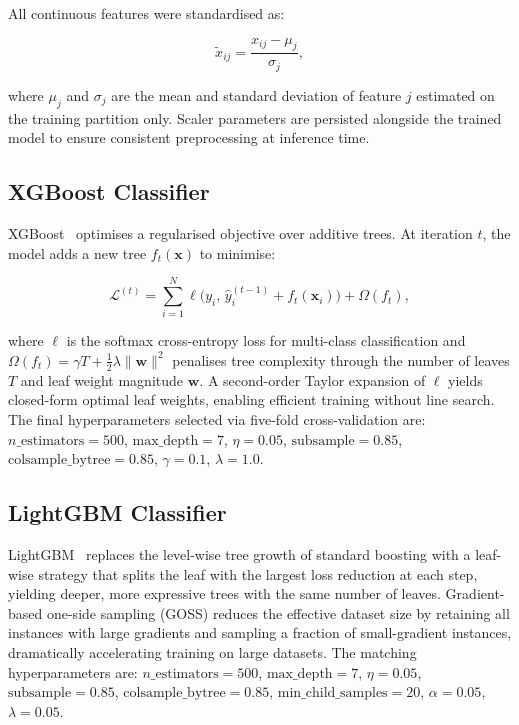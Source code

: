 \documentclass[journal]{IEEEtran}
\begin{document}
All continuous features were standardised as:

\begin{equation}
  \tilde{x}_{ij} = \frac{x_{ij} - \mu_j}{\sigma_j},
  \label{eq:zscore}
\end{equation}

\noindent where $\mu_j$ and $\sigma_j$ are the mean and standard deviation
of feature $j$ estimated on the training partition only. Scaler parameters
are persisted alongside the trained model to ensure consistent preprocessing
at inference time.

\subsection{XGBoost Classifier}

XGBoost~\cite{chen2016} optimises a regularised objective over additive
trees. At iteration $t$, the model adds a new tree $f_t(\mathbf{x})$ to
minimise:

\begin{equation}
  \mathcal{L}^{(t)} = \sum_{i=1}^{N}
    \ell\bigl(y_i,\, \hat{y}_i^{(t-1)} + f_t(\mathbf{x}_i)\bigr)
    + \Omega(f_t),
  \label{eq:xgb_obj}
\end{equation}

\noindent where $\ell$ is the softmax cross-entropy loss for multi-class
classification and $\Omega(f_t) = \gamma T + \tfrac{1}{2}\lambda\|\mathbf{w}\|^2$
penalises tree complexity through the number of leaves $T$ and leaf
weight magnitude $\mathbf{w}$. A second-order Taylor expansion of
$\ell$ yields closed-form optimal leaf weights, enabling efficient training
without line search. The final hyperparameters selected via five-fold
cross-validation are: $n\_\text{estimators} = 500$,
$\text{max\_depth} = 7$, $\eta = 0.05$, $\text{subsample} = 0.85$,
$\text{colsample\_bytree} = 0.85$, $\gamma = 0.1$, $\lambda = 1.0$.

\subsection{LightGBM Classifier}

LightGBM~\cite{ke2017} replaces the level-wise tree growth of standard
boosting with a leaf-wise strategy that splits the leaf with the largest
loss reduction at each step, yielding deeper, more expressive trees with
the same number of leaves. Gradient-based one-side sampling (GOSS) reduces
the effective dataset size by retaining all instances with large gradients
and sampling a fraction of small-gradient instances, dramatically accelerating
training on large datasets. The matching hyperparameters are:
$n\_\text{estimators} = 500$, $\text{max\_depth} = 7$, $\eta = 0.05$,
$\text{subsample} = 0.85$, $\text{colsample\_bytree} = 0.85$,
$\text{min\_child\_samples} = 20$, $\alpha = 0.05$, $\lambda = 0.05$.
\end{document}
